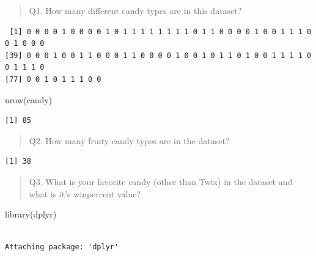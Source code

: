 \documentclass[
  letterpaper,
  DIV=11,
  numbers=noendperiod]{scrartcl}
\newenvironment{Shaded}{\begin{snugshade}}{\end{snugshade}}
\newcommand{\FunctionTok}[1]{\textcolor[rgb]{0.28,0.35,0.67}{#1}}
\newcommand{\NormalTok}[1]{\textcolor[rgb]{0.00,0.23,0.31}{#1}}
\newcommand{\SpecialCharTok}[1]{\textcolor[rgb]{0.37,0.37,0.37}{#1}}
\begin{document}
\begin{quote}
Q1. How many different candy types are in this dataset?
\end{quote}

\begin{Shaded}
\end{Shaded}

\begin{verbatim}
 [1] 0 0 0 0 1 0 0 0 0 1 0 1 1 1 1 1 1 1 1 0 1 1 0 0 0 0 1 0 0 1 1 1 0 0 1 0 0 0
[39] 0 0 0 1 0 0 1 1 0 0 0 1 1 0 0 0 0 1 0 0 1 0 1 1 0 1 0 0 1 1 1 1 0 0 1 1 1 0
[77] 0 0 1 0 1 1 1 0 0
\end{verbatim}

\begin{Shaded}
\begin{Highlighting}[]
\FunctionTok{nrow}\NormalTok{(candy)}
\end{Highlighting}
\end{Shaded}

\begin{verbatim}
[1] 85
\end{verbatim}

\begin{quote}
Q2. How many fruity candy types are in the dataset?
\end{quote}

\begin{Shaded}
\end{Shaded}

\begin{verbatim}
[1] 38
\end{verbatim}

\begin{quote}
Q3. What is your favorite candy (other than Twix) in the dataset and
what is it's winpercent value?
\end{quote}

\begin{Shaded}
\begin{Highlighting}[]
\FunctionTok{library}\NormalTok{(dplyr)}
\end{Highlighting}
\end{Shaded}

\begin{verbatim}

Attaching package: 'dplyr'
\end{verbatim}
\end{document}
